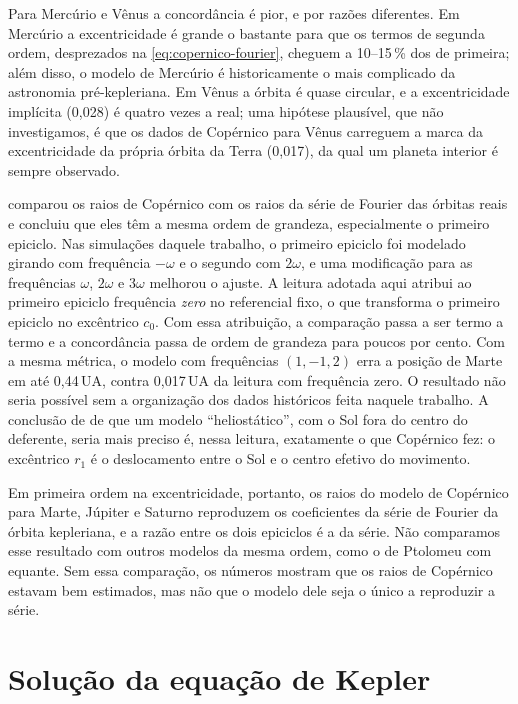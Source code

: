 Para Mercúrio e Vênus a concordância é pior, e por razões diferentes. Em Mercúrio a excentricidade é grande o bastante para que os termos de segunda ordem, desprezados na \autoref{eq:copernico-fourier}, cheguem a 10--15\,\% dos de primeira; além disso, o modelo de Mercúrio é historicamente o mais complicado da astronomia pré-kepleriana. Em Vênus a órbita é quase circular, e a excentricidade implícita (0,028) é quatro vezes a real; uma hipótese plausível, que não investigamos, é que os dados de Copérnico para Vênus carreguem a marca da excentricidade da própria órbita da Terra (0,017), da qual um planeta interior é sempre observado.

\begin{paraaprofundar}
 comparou os raios de Copérnico com os raios da série de Fourier das órbitas reais e concluiu que eles têm a mesma ordem de grandeza, especialmente o primeiro epiciclo. Nas simulações daquele trabalho, o primeiro epiciclo foi modelado girando com frequência $-\omega$ e o segundo com $2\omega$, e uma modificação para as frequências $\omega$, $2\omega$ e $3\omega$ melhorou o ajuste. A leitura adotada aqui atribui ao primeiro epiciclo frequência \emph{zero} no referencial fixo, o que transforma o primeiro epiciclo no excêntrico $c_0$. Com essa atribuição, a comparação passa a ser termo a termo e a concordância passa de ordem de grandeza para poucos por cento. Com a mesma métrica, o modelo com frequências $(1, -1, 2)$ erra a posição de Marte em até 0,44\,UA, contra 0,017\,UA da leitura com frequência zero. O resultado não seria possível sem a organização dos dados históricos feita naquele trabalho. A conclusão de  de que um modelo ``heliostático'', com o Sol fora do centro do deferente, seria mais preciso é, nessa leitura, exatamente o que Copérnico fez: o excêntrico $r_1$ é o deslocamento entre o Sol e o centro efetivo do movimento.
\end{paraaprofundar}

Em primeira ordem na excentricidade, portanto, os raios do modelo de Copérnico para Marte, Júpiter e Saturno reproduzem os coeficientes da série de Fourier da órbita kepleriana, e a razão entre os dois epiciclos é a da série. Não comparamos esse resultado com outros modelos da mesma ordem, como o de Ptolomeu com equante. Sem essa comparação, os números mostram que os raios de Copérnico estavam bem estimados, mas não que o modelo dele seja o único a reproduzir a série.

\section{Solução da equação de Kepler}

